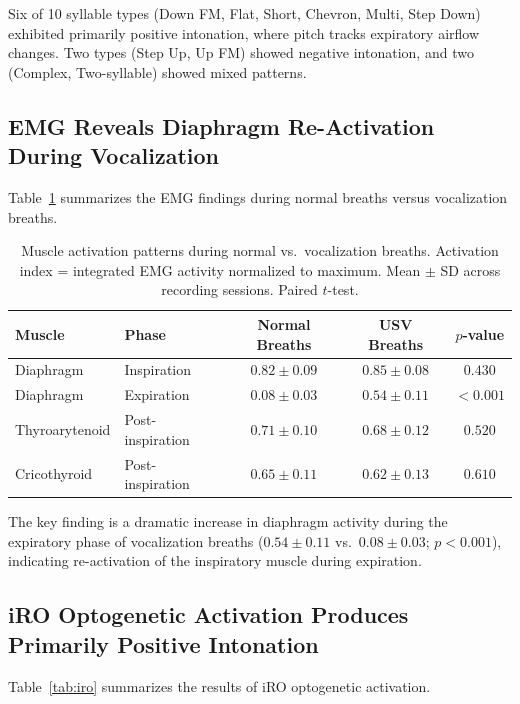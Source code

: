 \documentclass[11pt]{article}
\begin{document}
Six of 10 syllable types (Down FM, Flat, Short, Chevron, Multi, Step Down) exhibited primarily positive intonation, where pitch tracks expiratory airflow changes. Two types (Step Up, Up FM) showed negative intonation, and two (Complex, Two-syllable) showed mixed patterns.

\subsection{EMG Reveals Diaphragm Re-Activation During Vocalization}

Table~\ref{tab:emg} summarizes the EMG findings during normal breaths versus vocalization breaths.

\begin{table}[H]
\centering
\caption{Muscle activation patterns during normal vs.\ vocalization breaths. Activation index = integrated EMG activity normalized to maximum. Mean $\pm$ SD across recording sessions. Paired $t$-test.}
\label{tab:emg}
\begin{tabular}{llccc}
\toprule
Muscle & Phase & Normal Breaths & USV Breaths & $p$-value \\
\midrule
Diaphragm & Inspiration & $0.82 \pm 0.09$ & $0.85 \pm 0.08$ & $0.430$ \\
Diaphragm & Expiration & $0.08 \pm 0.03$ & $\mathbf{0.54 \pm 0.11}$ & $< 0.001$ \\
Thyroarytenoid & Post-inspiration & $0.71 \pm 0.10$ & $0.68 \pm 0.12$ & $0.520$ \\
Cricothyroid & Post-inspiration & $0.65 \pm 0.11$ & $0.62 \pm 0.13$ & $0.610$ \\
\bottomrule
\end{tabular}
\end{table}

The key finding is a dramatic increase in diaphragm activity during the expiratory phase of vocalization breaths ($0.54 \pm 0.11$ vs.\ $0.08 \pm 0.03$; $p < 0.001$), indicating re-activation of the inspiratory muscle during expiration.

\subsection{iRO Optogenetic Activation Produces Primarily Positive Intonation}

Table~\ref{tab:iro} summarizes the results of iRO optogenetic activation.
\end{document}
